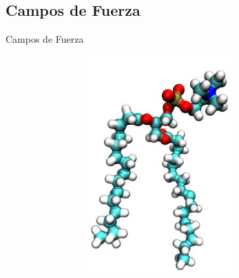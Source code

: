 \documentclass[8pt]{beamer}
\begin{document}
\subsection{Campos de Fuerza}
\begin{frame}[t]{Campos de Fuerza}
\justifying


\begin{figure}
\begin{figure}[ht]
\centering
\hspace*{\fill}
\begin{subfigure}[t]{.32\textwidth}
  \vspace{-1cm}
  \centering
  \includegraphics[width=0.8\textwidth]{Figure/FF-AA.png}
\end{subfigure}
\end{figure}
\end{figure}
\end{frame}
\end{document}
